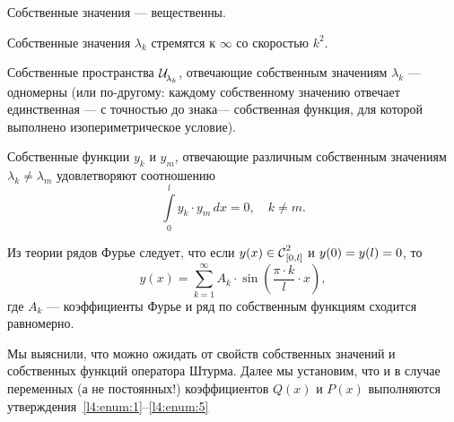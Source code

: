 \begin{enumerateD}
	\item\label{l4:enum:1} Собственные значения --- вещественны.
	\item Собственные значения $\lambda_k$ стремятся к $\infty$ со скоростью $k^2$.
	\item Собственные пространства $\displaystyle \Ul[\lambda_k]$, отвечающие собственным значениям $\lambda_k$ --- одномерны (или по-другому: каждому собственному значению отвечает единственная --- с точностью до знака--- собственная функция, для которой выполнено изопериметрическое условие).
	\item Собственные функции $y_k$ и $y_m$, отвечающие различным собственным значениям $\lambda_k\neq\lambda_m$ удовлетворяют соотношению
	\begin{equation*}
		\int\limits_0^l y_k\cdot y_m\,dx=0,\quad k\neq m.
	\end{equation*}
	\item\label{l4:enum:5} Из теории рядов Фурье следует, что если $y(x)\in\Cfn[{[0,l]}]{2}$ и $y(0)\?=y(l)=0$, то 
	\begin{equation*}
		 y(x)=\sum\limits_{k=1}^{\infty} A_k\cdot\sin\left(\frac{\pi\cdot k}{l}\cdot x\right),
	\end{equation*}
	где $A_k$ --- коэффициенты Фурье и ряд по собственным функциям сходится равномерно. 
\end{enumerateD}

Мы выяснили, что можно ожидать от свойств собственных значений и собственных функций оператора Штурма. Далее мы установим, что и в случае переменных (а не постоянных!) коэффициентов $Q(x)$ и $P(x)$ выполняются утверждения~\ref{l4:enum:1}--\ref{l4:enum:5}
